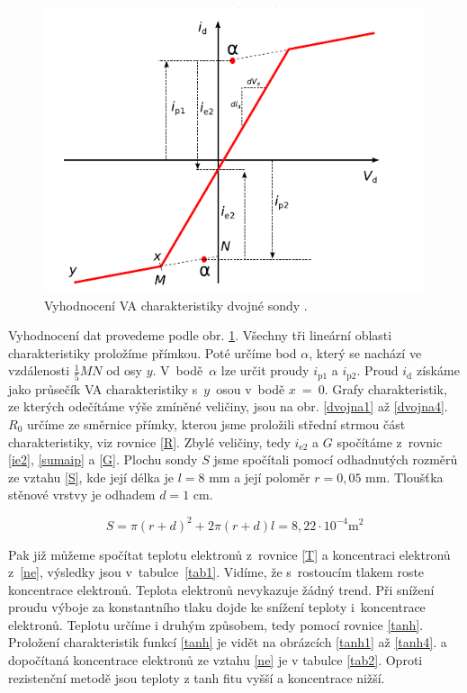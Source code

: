 \documentclass[a4paper,12pt]{article}
\begin{document}
\begin{figure}[h]
	\centering
	\includegraphics[width=130mm]{VAmerenidvojna.png}
	\caption{Vyhodnocení VA charakteristiky dvojné sondy \cite{navod}.}
	\label{VAmerenidvojna}
\end{figure}
Vyhodnocení dat provedeme podle obr. \ref{VAmerenidvojna}.
Všechny tři lineární oblasti charakteristiky proložíme přímkou.
Poté určíme bod $\alpha$, který se nachází ve vzdálenosti
$\frac{1}{5}MN$ od osy $y$. V~bodě~$\alpha$ lze určit proudy
$i_\text{{p1}}$ a $i_\text{{p2}}$. Proud $i_\text{{d}}$
získáme jako průsečík VA charakteristiky s~$y$~osou v~bodě
$x$~=~0. Grafy charakteristik, ze kterých odečítáme výše
zmíněné veličiny, jsou na obr. \ref{dvojna1} až \ref{dvojna4}.
$R_0$ určíme ze směrnice přímky, kterou jsme proložili
střední strmou část charakteristiky, viz rovnice \eqref{R}.
Zbylé veličiny, tedy $i_\text{{e2}}$ a $G$ spočítáme z~rovnic
\eqref{ie2}, \eqref{sumaip} a \eqref{G}. Plochu sondy $S$
jsme spočítali pomocí odhadnutých rozměrů ze vztahu \eqref{S},
kde její délka je $l = 8$ \si{\milli\meter} a její poloměr
$r = 0,05$ \si{\milli\meter}. Tloušťka stěnové
vrstvy je odhadem $d = 1$ \si{\centi\meter}.

\begin{equation}
	S = \pi (r+d)^2 + 2\pi (r+d) l = 8,22\cdot 10^{-4} \si{\meter\squared}
	\label{S}
\end{equation}

Pak již můžeme
spočítat teplotu elektronů z~rovnice \eqref{T} a koncentraci
elektronů z~\eqref{ne}, výsledky jsou v~tabulce~\ref{tab1}.
Vidíme, že s~rostoucím tlakem roste koncentrace elektronů.
Teplota elektronů nevykazuje žádný trend. Při snížení proudu
výboje za konstantního tlaku dojde ke snížení teploty i~koncentrace
elektronů.
\newpage
Teplotu určíme i druhým způsobem, tedy pomocí rovnice
\eqref{tanh}. Proložení charakteristik funkcí \eqref{tanh}
je vidět na obrázcích \ref{tanh1} až \ref{tanh4}.
a dopočítaná koncentrace elektronů ze vztahu \eqref{ne}
je v tabulce \ref{tab2}. Oproti rezistenční metodě jsou
teploty z tanh fitu vyšší a koncentrace nižší.
\end{document}
